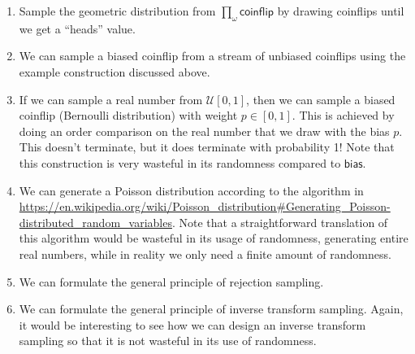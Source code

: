 \documentclass{article}           %
\newcommand{\coinflip}{\mathsf{coinflip}}
\begin{document}
\begin{enumerate}
\item Sample the geometric distribution from $\prod_\omega \coinflip$ by drawing coinflips until we get a ``heads'' value.
\item We can sample a biased coinflip from a stream of unbiased coinflips using the example construction discussed above.
\item If we can sample a real number from $\mathcal{U}[0,1]$, then we can sample a biased coinflip (Bernoulli distribution) with weight $p \in [0,1]$. This is achieved by doing an order comparison on the real number that we draw with the bias $p$. This doesn't terminate, but it does terminate with probability 1! Note that this construction is very wasteful in its randomness compared to $\mathsf{bias}$.
\item We can generate a Poisson distribution according to the algorithm in \url{https://en.wikipedia.org/wiki/Poisson_distribution#Generating_Poisson-distributed_random_variables}. Note that a straightforward translation of this algorithm would be wasteful in its usage of randomness, generating entire real numbers, while in reality we only need a finite amount of randomness.
\item We can formulate the general principle of rejection sampling.
\item We can formulate the general principle of inverse transform sampling. Again, it would be interesting to see how we can design an inverse transform sampling so that it is not wasteful in its use of randomness.
\end{enumerate}



\end{document}
